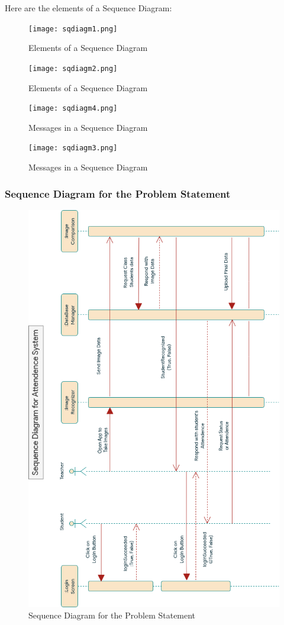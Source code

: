 \documentclass[11pt]{article}
\begin{document}
Here are the elements of a Sequence Diagram:
\begin{figure}[H]
	\centering
	\texttt{[image: sqdiagm1.png]}
	\caption{Elements of a Sequence Diagram}
\end{figure}
\begin{figure}[H]
	\centering
	\texttt{[image: sqdiagm2.png]}
	\caption{Elements of a Sequence Diagram}
\end{figure}
\begin{figure}[H]
	\centering
	\texttt{[image: sqdiagm4.png]}
	\caption{Messages in a Sequence Diagram}
\end{figure}
\begin{figure}[H]
	\centering
	\texttt{[image: sqdiagm3.png]}
	\caption{Messages in a Sequence Diagram}
\end{figure}

\subsubsection{Sequence Diagram for the Problem Statement}

\begin{figure}[H]
	\centering
	\includegraphics[height=1.2\textwidth]{Sequence Diagram.drawio.png}
	\caption{Sequence Diagram for the Problem Statement}
	\label{fig:state_diagram_problem_statement}
\end{figure}
\end{document}
